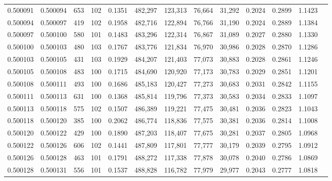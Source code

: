 \begin{tabular}{rrrrrrrrrrrrr}
0.500091 & 0.500094 &   653 & 102 &                                     0.1351 & 482,297 & 123,313 &  76,664 &  31,292 & 0.2024 & 0.2899 & 1.1423 \\
0.500094 & 0.500097 &   419 & 102 &                                     0.1958 & 482,716 & 122,894 &  76,766 &  31,190 & 0.2024 & 0.2889 & 1.1384 \\
0.500097 & 0.500100 &   580 & 101 &                                     0.1483 & 483,296 & 122,314 &  76,867 &  31,089 & 0.2027 & 0.2880 & 1.1330 \\
0.500100 & 0.500103 &   480 & 103 &                                     0.1767 & 483,776 & 121,834 &  76,970 &  30,986 & 0.2028 & 0.2870 & 1.1286 \\
0.500103 & 0.500105 &   431 & 103 &                                     0.1929 & 484,207 & 121,403 &  77,073 &  30,883 & 0.2028 & 0.2861 & 1.1246 \\
0.500105 & 0.500108 &   483 & 100 &                                     0.1715 & 484,690 & 120,920 &  77,173 &  30,783 & 0.2029 & 0.2851 & 1.1201 \\
0.500108 & 0.500111 &   493 & 100 &                                     0.1686 & 485,183 & 120,427 &  77,273 &  30,683 & 0.2031 & 0.2842 & 1.1155 \\
0.500111 & 0.500113 &   631 & 100 &                                     0.1368 & 485,814 & 119,796 &  77,373 &  30,583 & 0.2034 & 0.2833 & 1.1097 \\
0.500113 & 0.500118 &   575 & 102 &                                     0.1507 & 486,389 & 119,221 &  77,475 &  30,481 & 0.2036 & 0.2823 & 1.1043 \\
0.500118 & 0.500120 &   385 & 100 &                                     0.2062 & 486,774 & 118,836 &  77,575 &  30,381 & 0.2036 & 0.2814 & 1.1008 \\
0.500120 & 0.500122 &   429 & 100 &                                     0.1890 & 487,203 & 118,407 &  77,675 &  30,281 & 0.2037 & 0.2805 & 1.0968 \\
0.500122 & 0.500126 &   606 & 102 &                                     0.1441 & 487,809 & 117,801 &  77,777 &  30,179 & 0.2039 & 0.2795 & 1.0912 \\
0.500126 & 0.500128 &   463 & 101 &                                     0.1791 & 488,272 & 117,338 &  77,878 &  30,078 & 0.2040 & 0.2786 & 1.0869 \\
0.500128 & 0.500131 &   556 & 101 &                                     0.1537 & 488,828 & 116,782 &  77,979 &  29,977 & 0.2043 & 0.2777 & 1.0818 \\

\end{tabular}
